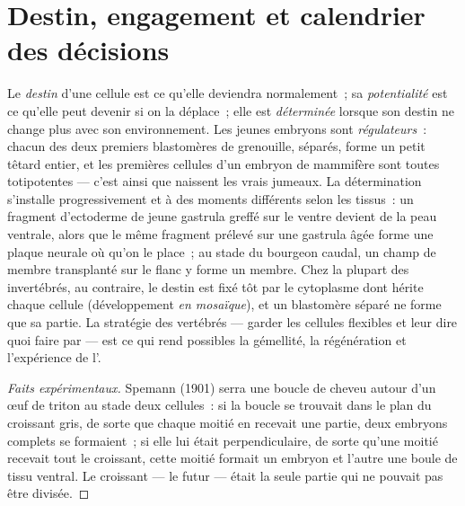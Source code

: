 \section{Destin, engagement et calendrier des décisions}

\begin{proposition}\label{prop:b2:vertebrate-development:commitment}
Le \emph{destin} d'une cellule est ce qu'elle deviendra normalement~; sa
\emph{potentialité} est ce qu'elle peut devenir si on la déplace~; elle
est \emph{déterminée} lorsque son destin ne change plus avec son
environnement. Les jeunes embryons sont \emph{régulateurs}~: chacun des
deux premiers blastomères de grenouille, séparés, forme un petit têtard
entier, et les premières cellules d'un embryon de mammifère sont toutes
totipotentes --- c'est ainsi que naissent les vrais jumeaux. La
détermination s'installe progressivement et à des moments différents
selon les tissus~: un fragment d'ectoderme de jeune gastrula greffé sur
le ventre devient de la peau ventrale, alors que le même fragment
prélevé sur une gastrula âgée forme une plaque neurale où qu'on le
place~; au stade du bourgeon caudal, un champ de membre transplanté sur
le flanc y forme un membre. Chez la plupart des invertébrés, au
contraire, le destin est fixé tôt par le cytoplasme dont hérite chaque
cellule (développement \emph{en mosaïque}), et un blastomère séparé ne
forme que sa partie. La stratégie des vertébrés --- garder les cellules
flexibles et leur dire quoi faire par  --- est ce qui rend
possibles la gémellité, la régénération et l'expérience de
l'.
\end{proposition}
\begin{proof}[Faits expérimentaux]
Spemann (1901) serra une boucle de cheveu autour d'un œuf de triton au
stade deux cellules~: si la boucle se trouvait dans le plan du croissant
gris, de sorte que chaque moitié en recevait une partie, deux embryons
complets se formaient~; si elle lui était perpendiculaire, de sorte
qu'une moitié recevait tout le croissant, cette moitié formait un
embryon et l'autre une boule de tissu ventral. Le croissant --- le futur
 --- était la seule partie qui ne pouvait pas être divisée.
\end{proof}

